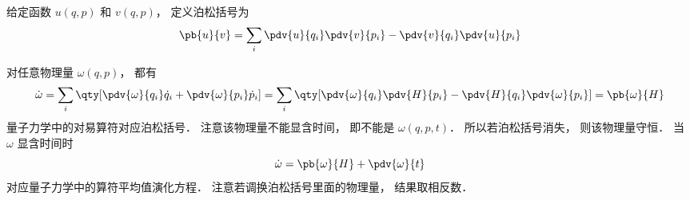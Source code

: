 
\begin{issues}
\issueDraft
\end{issues}


给定函数 $u(q, p)$ 和 $v(q, p)$， 定义泊松括号为
\begin{equation}
\pb{u}{v} = \sum_i \pdv{u}{q_i}\pdv{v}{p_i} - \pdv{v}{q_i}\pdv{u}{p_i}
\end{equation}

对任意物理量 $\omega (q,p)$，   都有
\begin{equation}\label{poison_eq1}
\dot \omega  = \sum_i \qty[ \pdv{\omega}{q_i} \dot q_i + \pdv{\omega}{p_i} \dot p_i ]  = \sum_i \qty[\pdv{\omega}{q_i} \pdv{H}{p_i} - \pdv{H}{q_i} \pdv{\omega}{p_i} ]  =  \pb{\omega}{H} 
\end{equation}
量子力学中的对易算符对应泊松括号． 注意该物理量不能显含时间， 即不能是 $\omega (q,p,t)$．  所以若泊松括号消失， 则该物理量守恒． 当 $\omega$ 显含时间时
\begin{equation}
\dot \omega  =  \pb{\omega}{H}  + \pdv{\omega}{t}
\end{equation}
对应量子力学中的算符平均值演化方程． 注意若调换泊松括号里面的物理量， 结果取相反数．
